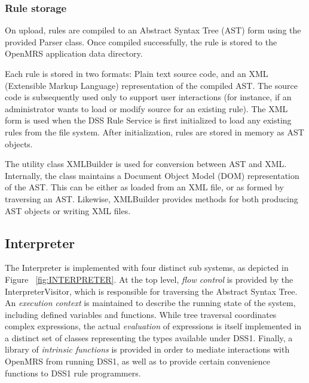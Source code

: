 \documentclass[12pt,letterpaper]{article}
\begin{document}
{\subsubsection{Rule storage} \label{sec:RULE_STORAGE}

On upload, rules are compiled to an Abstract Syntax Tree (AST) form 
using the provided Parser class. Once compiled successfully, the rule is stored to the OpenMRS application data directory. 

Each rule is  stored in two formats: Plain text source code, and an XML (Extensible Markup Language) representation of the compiled AST. The 
source code is subsequently used only to support user interactions (for instance, if an administrator wants to load or modify source for an existing rule). The XML form is used when the DSS Rule Service is first initialized to load any existing rules from the file system. After initialization, rules are stored in memory as AST objects.

The utility class XMLBuilder is used for conversion between AST and XML. Internally, the class maintains a Document Object Model (DOM) representation of the AST. This can be either as loaded from an XML file, or as formed by traversing an AST. Likewise, XMLBuilder provides methods for both producing AST objects or writing XML files.

\subsection{Interpreter} \label{sec:INTERPRETER}

The Interpreter is implemented with four distinct sub systems, as depicted in Figure ~\ref{fig:INTERPRETER}.
At the top level, \emph{flow control} is provided by the InterpreterVisitor, which is responsible for traversing the Abstract Syntax Tree. An \emph{execution context} is maintained to describe the running state of the system, including defined variables and functions. While tree traversal coordinates complex expressions, the actual \emph{evaluation} of expressions is itself implemented in a distinct set of classes representing the types available under DSS1. Finally, a library of \emph{intrinsic functions} is provided in order to mediate interactions with OpenMRS from running DSS1, as well as to provide certain convenience functions to DSS1 rule programmers.

}
\end{document}
